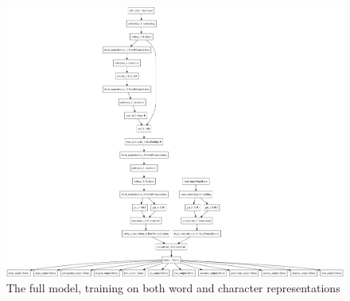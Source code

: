 \begin{figure}[H]
    \centering
        \includegraphics[width=\textwidth]{pictures/model.png}
        \caption{The full model, training on both word and character representations}
        \label{fig:fullmodel}
\end{figure}

